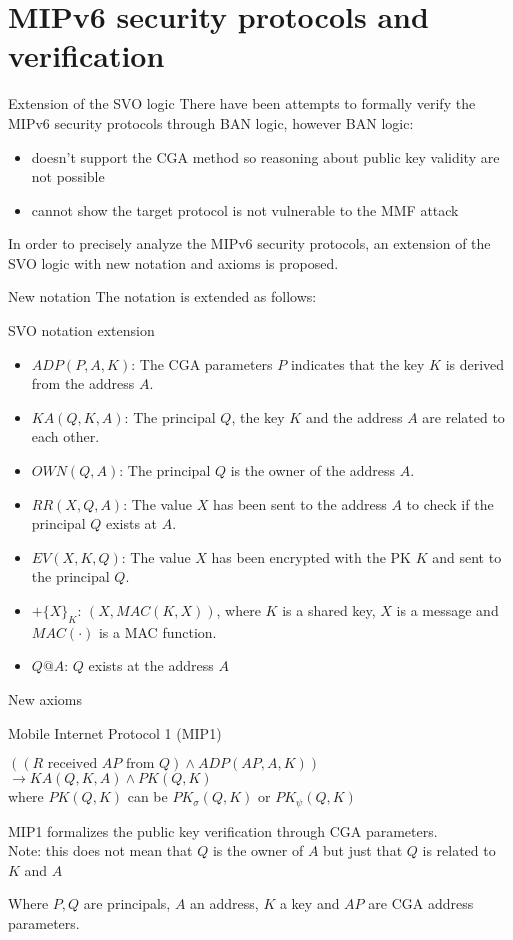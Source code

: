\documentclass[10pt]{beamer}
\newcommand{\xtext}[1]{\text{ #1 }}
\begin{document}
\section{MIPv6 security protocols and verification}
\begin{frame}{Extension of the SVO logic}
	There have been attempts to formally verify the MIPv6 security protocols through BAN logic, however BAN logic:
	\begin{itemize}
		\item doesn't support the CGA method so reasoning about public key validity are not possible
		\item cannot show the target protocol is not vulnerable to the MMF attack
	\end{itemize}
	\par
	In order to precisely analyze the MIPv6 security protocols, an extension of the SVO logic with new notation and axioms is proposed.
\end{frame}
\begin{frame}{New notation}
	\small
	The notation is extended as follows:
	\begin{block}{SVO notation extension}
		\begin{itemize}
			\item $ADP(P,A,K)$: The CGA parameters $P$ indicates that the key $K$ is derived from the address $A$.
			\item $KA(Q,K,A)$: The principal $Q$, the key $K$ and the address $A$ are related to each other.
			\item $OWN(Q, A)$: The principal $Q$ is the owner of the address $A$.
			\item $RR(X,Q,A)$: The value $X$ has been sent to the address $A$ to check if the principal $Q$ exists at $A$.
			\item $EV(X,K,Q)$: The value $X$ has been encrypted with the PK $K$ and sent to the principal $Q$.
			\item ${+}\{X\}_K$: $(X,MAC(K,X))$, where $K$ is a shared key, $X$ is a message and $MAC(\cdot)$ is a MAC function.
			\item $Q@A$: $Q$ exists at the address $A$
		\end{itemize}
	\end{block}
\end{frame}
\begin{frame}{New axioms}
	\begin{block}{Mobile Internet Protocol 1 (MIP1)}
		{\centering
		$((R \xtext{received} AP \xtext{from} Q) \land ADP(AP,A,K))$\\$\rightarrow KA(Q,K,A) \land PK(Q,K)$ \\ where $PK(Q,K)$ can be $PK_\sigma(Q,K)$ or $PK_\psi(Q,K)$\par}
		MIP1 formalizes the public key verification through CGA parameters. \\ \alert{Note:} this does not mean that $Q$ is the owner of $A$ but just that $Q$ is related to $K$ and $A$
	\end{block}
	Where $P,Q$ are principals, $A$ an address, $K$ a key and $AP$ are CGA address parameters.
\end{frame}
\end{document}
